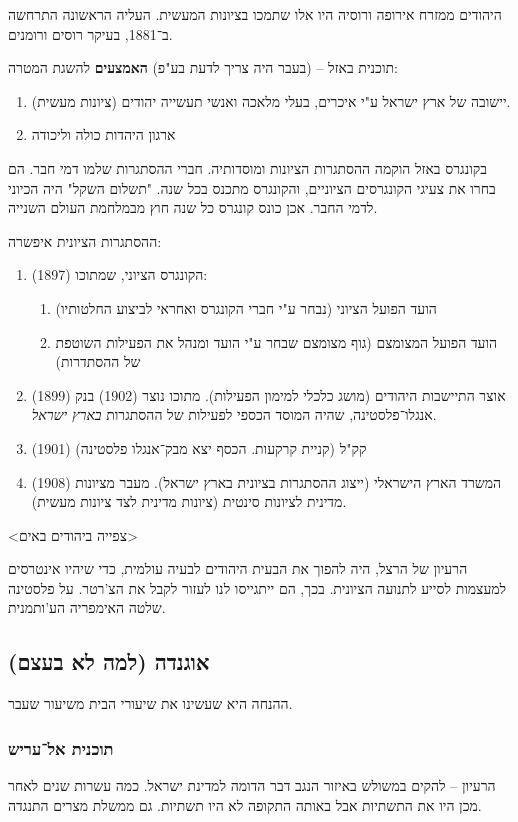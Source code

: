 \documentclass[a4paper]{book}
\begin{document}
	היהודים ממזרח אירופה ורוסיה היו אלו שתמכו בציונות המעשית. העליה הראשונה התרחשה ב־1881, בעיקר רוסים ורומנים. 
	
	תוכנית באזל – (בעבר היה צריך לדעת בע"פ)
	\textbf{האמצעים} להשגת המטרה: 
	\begin{enumerate}
		\item יישובה של ארץ ישראל ע"י איכרים, בעלי מלאכה ואנשי תעשייה יהודים (ציונות מעשית). 
		\item ארגון היהדות כולה וליכודה
	\end{enumerate}
	
	בקונגרס באזל הוקמה ההסתגרות הציונות ומוסדותיה. חברי ההסתגרות שלמו דמי חבר. הם בחרו את צעיגי הקונגרסים הציוניים, והקונגרס מתכנס בכל שנה. "תשלום השקל" היה הכיוני לדמי החבר. אכן כונס קונגרס כל שנה חוץ מבמלחמת העולם השנייה. 
	
	ההסתגרות הציונית איפשרה: 
	\begin{enumerate}
		\item (1897) הקונגרס הציוני, שמתוכו: 
		\begin{enumerate}
			\item הועד הפועל הציוני (נבחר ע"י חברי הקונגרס ואחראי לביצוע החלטותיו)
			\item הועד הפועל המצומצם (גוף מצומצם שבחר ע"י הועד ומנהל את הפעילות השוטפת של ההסתדרות)
		\end{enumerate}
		\item (1899) אוצר התיישבות היהודים (מושג כלכלי למימון הפעילות). מתוכו נוצר (1902) בנק אנגלו־פלסטינה, שהיה המוסד הכספי לפעילות של ההסתגרות \textit{בארץ ישראל}. 
		\item (1901) קק"ל (קניית קרקעות. הכסף יצא מבק־אנגלו פלסטינה)
		\item (1908) המשרד הארץ הישראלי (ייצוג ההסתגרות בציונית בארץ ישראל). מעבר מציונות מדינית לציונות סינטית (ציונות מדינית לצד ציונות מעשית). 
	\end{enumerate}
	
	<צפייה ביהודים באים> 
	
	הרעיון של הרצל, היה להפוך את הבעית היהודים לבעיה עולמית, כדי שיהיו אינטרסים למעצמות לסייע לתנועה הציונית. בכך, הם ייתגייסו לנו לעזור לקבל את הצ'רטר. על פלסטינה שלטה האימפריה הע'ותמנית. 
	
	
	\subsection{אוגנדה (למה לא בעצם)}
	ההנחה היא שעשינו את שיעורי הבית משיעור שעבר. 
	\subsubsection{תוכנית אל־עריש}
	הרעיון – להקים במשולש באיזור הנגב דבר הדומה למדינת ישראל. כמה עשרות שנים לאחר מכן היו את התשתיות אבל באותה התקופה לא היו תשתיות. גם ממשלת מצרים התנגדה. 
\end{document}
